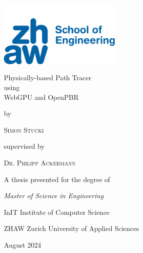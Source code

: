 
\begin{titlepage}
  \centering
  \includegraphics[width=6cm]{resources/zhaw-soe-logo.png}\par
  \vspace{4\baselineskip}
  {\Huge 
  Physically-based Path Tracer\\ using \\ WebGPU and OpenPBR\par}
  \vspace{4\baselineskip}
  by\par
  {\Large\textsc{Simon Stucki}\par}
  \vspace{2\baselineskip}
  supervised by\par
  {\textsc{Dr. Philipp Ackermann}\par}
  \vfill
  A thesis presented for the degree of\par
  {\em Master of Science in Engineering}\par
  \vspace{1\baselineskip}
  InIT Institute of Computer Science\par
  ZHAW Zurich University of Applied Sciences\par
  \vspace{1\baselineskip}
  August 2024\par
\end{titlepage}
